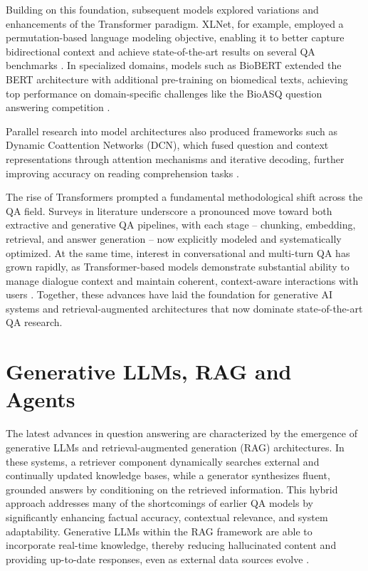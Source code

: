 \begin{spacing}{1.5}
Building on this foundation, subsequent models explored variations and enhancements of the Transformer paradigm. XLNet, for example, employed a permutation-based language modeling objective, enabling it to better capture bidirectional context and achieve state-of-the-art results on several QA benchmarks \citep{yang_xlnet_2020}. In specialized domains, models such as BioBERT extended the BERT architecture with additional pre-training on biomedical texts, achieving top performance on domain-specific challenges like the BioASQ question answering competition \citep{yoon_pre-trained_2019}.

Parallel research into model architectures also produced frameworks such as Dynamic Coattention Networks (DCN), which fused question and context representations through attention mechanisms and iterative decoding, further improving accuracy on reading comprehension tasks \citep{xiong_dynamic_2018}.

The rise of Transformers prompted a fundamental methodological shift across the QA field. Surveys in literature underscore a pronounced move toward both extractive and generative QA pipelines, with each stage -- chunking, embedding, retrieval, and answer generation -- now explicitly modeled and systematically optimized. At the same time, interest in conversational and multi-turn QA has grown rapidly, as Transformer-based models demonstrate substantial ability to manage dialogue context and maintain coherent, context-aware interactions with users \citep{yue_survey_2025,antoniou_survey_2022}. Together, these advances have laid the foundation for generative AI systems and retrieval-augmented architectures that now dominate state-of-the-art QA research.

\section{Generative LLMs, RAG and Agents}

The latest advances in question answering are characterized by the emergence of generative LLMs and retrieval-augmented generation (RAG) architectures. In these systems, a retriever component dynamically searches external and continually updated knowledge bases, while a generator synthesizes fluent, grounded answers by conditioning on the retrieved information. This hybrid approach addresses many of the shortcomings of earlier QA models by significantly enhancing factual accuracy, contextual relevance, and system adaptability. Generative LLMs within the RAG framework are able to incorporate real-time knowledge, thereby reducing hallucinated content and providing up-to-date responses, even as external data sources evolve \citep{yue_survey_2025,lewis_retrieval-augmented_2020}. 


\end{spacing}
